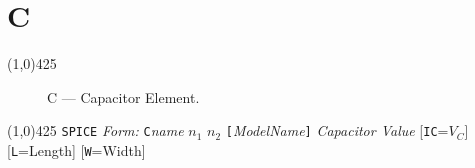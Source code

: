 
\oddsidemargin 10mm \topmargin 0.0in \textwidth 5.5in \textheight
7.375in \evensidemargin 1.0in \headheight 0.18in \footskip 0.16in
%
\section[C \- Capacitor]{ \hspace{107mm}\huge \textbf{C}}
\linethickness{1mm} \line(1,0){425} \normalsize
\begin{figure}[h]
\centerline{\epsfxsize=1in} \caption{C ---
Capacitor Element.}
\end{figure}
\newline
\linethickness{0.5mm} \line(1,0){425}
\newline
\texttt{SPICE} \textit{Form:}
\newline
\texttt{C}\textit{name} $n_1$ $n_2$
\texttt{[}\textit{ModelName}\texttt{]} \textit{Capacitor Value}
[\texttt{IC}=$V_C$] [\texttt{L}=Length] [\texttt{W}=Width]
\newline
\newline

